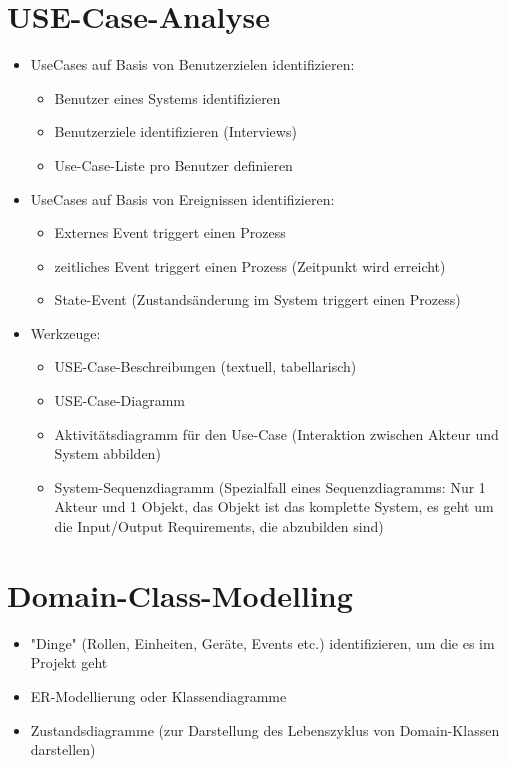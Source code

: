 \section{USE-Case-Analyse}
\begin{itemize}
	\item UseCases auf Basis von Benutzerzielen identifizieren: 
	\begin{itemize}
		\item Benutzer eines Systems identifizieren
		\item Benutzerziele identifizieren (Interviews)
		\item Use-Case-Liste pro Benutzer definieren
	\end{itemize}
	\item UseCases auf Basis von Ereignissen identifizieren: 
	\begin{itemize}
		\item Externes Event triggert einen Prozess
		\item zeitliches Event triggert einen Prozess (Zeitpunkt wird erreicht) 
		\item State-Event (Zustandsänderung im System triggert einen Prozess)
	\end{itemize}
	\item Werkzeuge:
	\begin{itemize}
		\item USE-Case-Beschreibungen (textuell, tabellarisch)
		\item USE-Case-Diagramm
		\item Aktivitätsdiagramm für den Use-Case (Interaktion zwischen Akteur und System abbilden)
		\item System-Sequenzdiagramm (Spezialfall eines Sequenzdiagramms: Nur 1 Akteur und 1 Objekt, das Objekt ist das komplette System, es geht um die Input/Output Requirements, die abzubilden sind)
	\end{itemize}
\end{itemize}

\section{Domain-Class-Modelling}
\begin{itemize}
	\item "Dinge" (Rollen, Einheiten, Geräte, Events etc.) identifizieren, um die es im Projekt geht
	\item ER-Modellierung oder Klassendiagramme
	\item Zustandsdiagramme (zur Darstellung des Lebenszyklus von Domain-Klassen darstellen)
\end{itemize}

